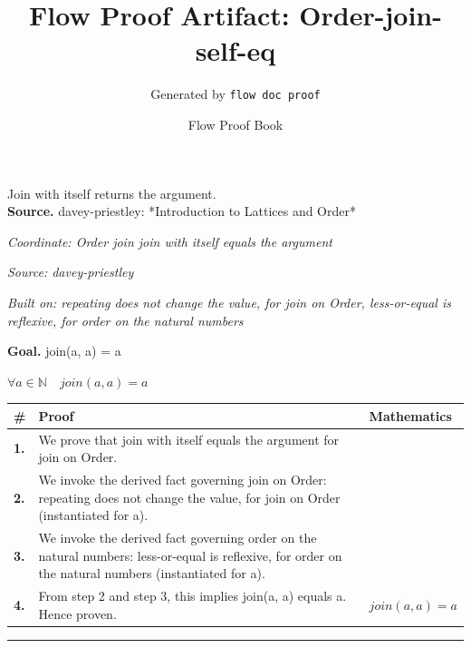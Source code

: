 \documentclass[11pt]{article}
\title{Flow Proof Artifact: Order-join-self-eq}
\author{Generated by \texttt{flow doc proof}}
\date{Flow Proof Book}
\theoremstyle{definition}
\begin{document}
\maketitle
Join with itself returns the argument.\\[0.5em]
\textbf{Source.} davey-priestley: *Introduction to Lattices and Order*\\[0.5em]
\bigskip
{}\par
\smallskip\noindent\textit{Coordinate: Order \cdot join \cdot join with itself equals the argument}\par
\smallskip\noindent\textit{Source: davey-priestley}\par
\smallskip\noindent\textit{Built on: repeating does not change the value, for join on Order, less-or-equal is reflexive, for order on the natural numbers}\par
\medskip
\noindent\textbf{Goal.} join(a, a) = a\par
\noindent$\displaystyle \forall a \in \mathbb{N}\quad join(a, a) = a$\par
\medskip
\noindent
\begin{tabular}{@{} >{\raggedright\arraybackslash}p{} >{\raggedright\arraybackslash}p{} >{\raggedleft\arraybackslash}p{} @{}}
\textbf{\#} & \textbf{Proof} & \textbf{Mathematics} \\
\midrule
\textbf{1.} & We prove that join with itself equals the argument for join on Order. & \\[0.45em]
\textbf{2.} & We invoke the derived fact governing join on Order: repeating does not change the value, for join on Order (instantiated for a). & \\[0.45em]
\textbf{3.} & We invoke the derived fact governing order on the natural numbers: less-or-equal is reflexive, for order on the natural numbers (instantiated for a). & \\[0.45em]
\textbf{4.} & From step 2 and step 3, this implies join(a, a) equals a. Hence proven. & $\displaystyle join(a, a) = a$ \\[0.45em]
\bottomrule
\end{tabular}
\label{thm:Order-join-join_with_itself_equals_the_argument}
\par\medskip\hrule
\end{document}
